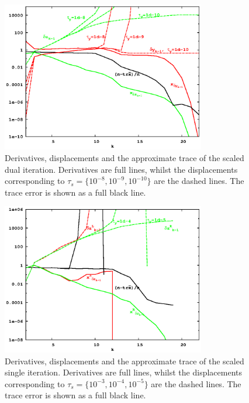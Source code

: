 \documentclass[letterpaper,twocolumn,amsmath,amsfont,amssymb,english,aps,jcp,preprintnumbers,groupaddress,nofootinbib,tightenlines,floatfix]{revtex4}
\theoremstyle{plain}
\theoremstyle{remark}
\theoremstyle{plain}
\begin{document}
\begin{figure}[h] 
\includegraphics[width=3.5in]{fig_33_tube_cond_10_scaled/33_tube_k10_scale_dual.eps}
\caption{Derivatives, displacements and the approximate trace of the scaled dual iteration.
Derivatives are full lines, whilst the displacements corresponding to $\tau_s=\{10^{-8}, 10^{-9}, 10^{-10}\}$
are the dashed lines.  The trace error is shown as a full black line. }\label{flow_scaled_dual}
\end{figure}

\begin{figure}[h]
\includegraphics[width=3.5in]{fig_33_tube_cond_10_scaled/33_tube_k10_scale_stab.eps}
\caption{Derivatives, displacements and the approximate trace of the scaled single iteration.
Derivatives are full lines, whilst the displacements corresponding to $\tau_s=\{10^{-3}, 10^{-4}, 10^{-5}\}$
are the dashed lines.  The trace error is shown as a full black line. }\label{flow_scaled_stab}
\end{figure}
\end{document}
